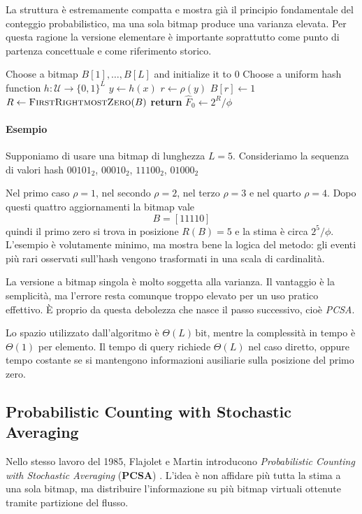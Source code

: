 La struttura è estremamente compatta e mostra già il principio fondamentale del
conteggio probabilistico, ma una sola bitmap produce una varianza elevata. Per
questa ragione la versione elementare è importante soprattutto come punto di
partenza concettuale e come riferimento storico.

\begin{algorithm}[htbp]
    \caption{Probabilistic Counting}
    \label{alg:pc}
    \begin{algorithmic}
        \STATE Choose a bitmap $B[1],\dots,B[L]$ and initialize it to $0$
        \STATE Choose a uniform hash function $h:\mathcal{U}\rightarrow\{0,1\}^{L}$
            \STATE $y \leftarrow h(x)$
            \STATE $r \leftarrow \rho(y)$
            \STATE $B[r]\leftarrow 1$
        \ENDFOR
        \STATE $R \leftarrow \textsc{FirstRightmostZero}(B)$
        \STATE \textbf{return} $\hat{F}_0 \leftarrow 2^R/\phi$
    \end{algorithmic}
\end{algorithm}

\paragraph{Esempio}
Supponiamo di usare una bitmap di lunghezza $L=5$. Consideriamo la sequenza di
valori hash
$00101_2$, $00010_2$, $11100_2$, $01000_2$

Nel primo caso $\rho=1$, nel secondo $\rho=2$, nel
terzo $\rho=3$ e nel quarto $\rho=4$. Dopo questi
quattro aggiornamenti la bitmap vale
\[
B=[11110]
\]
quindi il primo zero si trova in posizione $R(B)=5$ e la stima è circa
$2^5/\phi$. L'esempio è volutamente minimo, ma mostra bene la logica del
metodo: gli eventi pi\`u rari osservati sull'hash vengono trasformati in una scala di
cardinalità.

La versione a bitmap singola è molto soggetta alla varianza. Il vantaggio è la semplicità,
ma l'errore resta comunque troppo elevato per un uso pratico effettivo. È proprio da
questa debolezza che nasce il passo successivo, cioè \textit{PCSA}.

Lo spazio utilizzato dall'algoritmo è $\Theta(L)\,\text{bit}$, mentre la complessità in tempo è $\Theta(1)$ per elemento. 
Il tempo di query richiede
$\Theta(L)$ nel caso diretto, oppure tempo costante se si mantengono informazioni ausiliarie
sulla posizione del primo zero.

\subsection{Probabilistic Counting with Stochastic Averaging}
Nello stesso lavoro del 1985, Flajolet e Martin introducono
\emph{Probabilistic Counting with Stochastic Averaging} (\textbf{PCSA})
\cite{Flajolet_Martin_1985}. L'idea è non affidare più tutta la stima a una
sola bitmap, ma distribuire l'informazione su più bitmap virtuali ottenute
tramite partizione del flusso.

